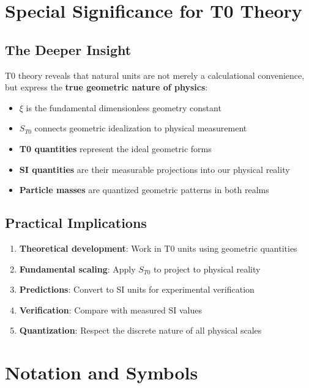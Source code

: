 	\section{Special Significance for T0 Theory}
	
	\subsection{The Deeper Insight}
	T0 theory reveals that natural units are not merely a calculational convenience, but express the \textbf{true geometric nature of physics}:
	\begin{itemize}
		\item \textbf{$\xi$} is the fundamental dimensionless geometry constant
		\item \textbf{$S_{T0}$} connects geometric idealization to physical measurement
		\item \textbf{T0 quantities} represent the ideal geometric forms
		\item \textbf{SI quantities} are their measurable projections into our physical reality
		\item \textbf{Particle masses} are quantized geometric patterns in both realms
	\end{itemize}
	
	\subsection{Practical Implications}
	\begin{enumerate}
		\item \textbf{Theoretical development}: Work in T0 units using geometric quantities
		\item \textbf{Fundamental scaling}: Apply $S_{T0}$ to project to physical reality
		\item \textbf{Predictions}: Convert to SI units for experimental verification
		\item \textbf{Verification}: Compare with measured SI values
		\item \textbf{Quantization}: Respect the discrete nature of all physical scales
	\end{enumerate}
	
	\section{Notation and Symbols}
	
